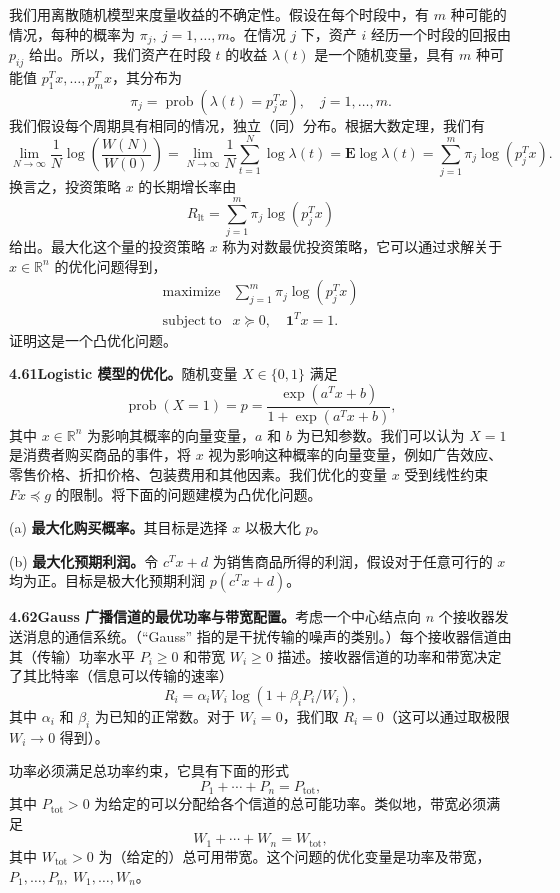 \documentclass[UTF8, 12pt, fontset=fandol, oneside]{ctexart}
\begin{document}
我们用离散随机模型来度量收益的不确定性。假设在每个时段中，有 $m$ 种可能的情况，每种的概率为 $\pi_j,\ j=1,\ldots,m$。在情况 $j$ 下，资产 $i$ 经历一个时段的回报由 $p_{ij}$ 给出。所以，我们资产在时段 $t$ 的收益 $\lambda(t)$ 是一个随机变量，具有 $m$ 种可能值 $p_1^Tx,\ldots,p_m^Tx$，其分布为
\[
\pi_j=\operatorname{prob}(\lambda(t)=p_j^Tx),\quad j=1,\ldots,m.
\]
我们假设每个周期具有相同的情况，独立（同）分布。根据大数定理，我们有
\[
\lim_{N\to\infty}\frac{1}{N}\log\left(\frac{W(N)}{W(0)}\right)
=\lim_{N\to\infty}\frac{1}{N}\sum_{t=1}^N\log\lambda(t)
=\mathbf{E}\log\lambda(t)=\sum_{j=1}^m\pi_j\log(p_j^Tx).
\]
换言之，投资策略 $x$ 的长期增长率由
\[
R_{\mathrm{lt}}=\sum_{j=1}^m\pi_j\log(p_j^Tx)
\]
给出。最大化这个量的投资策略 $x$ 称为对数最优投资策略，它可以通过求解关于 $x\in\mathbb{R}^n$ 的优化问题得到，
\[
\begin{array}{ll}
\mathop{\mathrm{maximize}} & \displaystyle\sum_{j=1}^m\pi_j\log(p_j^Tx)\\
\mathrm{subject\ to} & x\succeq0,\quad \mathbf{1}^Tx=1.
\end{array}
\]
证明这是一个凸优化问题。

\noindent\textbf{4.61\quad Logistic 模型的优化。}\quad 随机变量 $X\in\{0,1\}$ 满足
\[
\operatorname{prob}(X=1)=p=\frac{\exp(a^Tx+b)}{1+\exp(a^Tx+b)},
\]
其中 $x\in\mathbb{R}^n$ 为影响其概率的向量变量，$a$ 和 $b$ 为已知参数。我们可以认为 $X=1$ 是消费者购买商品的事件，将 $x$ 视为影响这种概率的向量变量，例如广告效应、零售价格、折扣价格、包装费用和其他因素。我们优化的变量 $x$ 受到线性约束 $Fx\preceq g$ 的限制。将下面的问题建模为凸优化问题。

(a) \textbf{最大化购买概率。}\quad 其目标是选择 $x$ 以极大化 $p$。

(b) \textbf{最大化预期利润。}\quad 令 $c^Tx+d$ 为销售商品所得的利润，假设对于任意可行的 $x$ 均为正。目标是极大化预期利润 $p(c^Tx+d)$。

\noindent\textbf{4.62\quad Gauss 广播信道的最优功率与带宽配置。}\quad 考虑一个中心结点向 $n$ 个接收器发送消息的通信系统。（“Gauss” 指的是干扰传输的噪声的类别。）每个接收器信道由其（传输）功率水平 $P_i\geq0$ 和带宽 $W_i\geq0$ 描述。接收器信道的功率和带宽决定了其比特率（信息可以传输的速率）
\[
R_i=\alpha_iW_i\log(1+\beta_iP_i/W_i),
\]
其中 $\alpha_i$ 和 $\beta_i$ 为已知的正常数。对于 $W_i=0$，我们取 $R_i=0$（这可以通过取极限 $W_i\to0$ 得到）。

功率必须满足总功率约束，它具有下面的形式
\[
P_1+\cdots+P_n=P_{\mathrm{tot}},
\]
其中 $P_{\mathrm{tot}}>0$ 为给定的可以分配给各个信道的总可能功率。类似地，带宽必须满足
\[
W_1+\cdots+W_n=W_{\mathrm{tot}},
\]
其中 $W_{\mathrm{tot}}>0$ 为（给定的）总可用带宽。这个问题的优化变量是功率及带宽，$P_1,\ldots,P_n,\ W_1,\ldots,W_n$。
\end{document}
